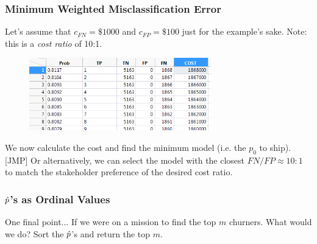 \documentclass[handout]{beamer}
\begin{document}
\begin{frame}\frametitle{Minimum Weighted Misclassification Error}

Let's assume that $c_{FN} = \$1000$ and $c_{FP} = \$100$ just for the example's sake. Note: this is a \emph{cost ratio} of 10:1.

\vspace{-0.2cm}
\begin{figure}
\centering
\hspace{-0.5cm}\includegraphics[width=3.1in]{weighted_misclassification_costs.png}
\end{figure}

We now calculate the cost and find the minimum model (i.e. the $p_0$ to ship). [JMP] \pause Or alternatively, we can select the model with the closest $FN / FP \approx 10:1$ to match the stakeholder preference of the desired cost ratio.



	
\end{frame}

\begin{frame}\frametitle{$\hat{p}$'s as Ordinal Values}

One final point... If we were on a mission to find the top $m$ churners. What would we do? \pause Sort the $\hat{p}$'s and return the top $m$.
	
\end{frame}
\end{document}
